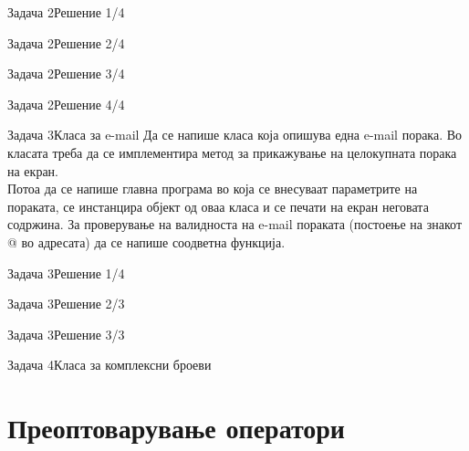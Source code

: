 \begin{frame}[fragile]{Задача 2}{Решение 1/4}

\end{frame}

\begin{frame}[fragile]{Задача 2}{Решение 2/4}

\end{frame}

\begin{frame}[fragile]{Задача 2}{Решение 3/4}

\end{frame}

\begin{frame}[fragile]{Задача 2}{Решение 4/4}

\end{frame}

\begin{frame}{Задача 3}{Класа за e-mail}
Да се напише класа која опишува една e-mail порака. Во класата треба да се
имплементира метод за прикажување на целокупната порака на екран.\\
Потоа да се напише главна програма во која се внесуваат параметрите на пораката,
се инстанцира објект од оваа класа и се печати на екран неговата содржина. За
проверување на валидноста на e-mail пораката (постоење на знакот @ во адресата)
да се напише соодветна функција.
\end{frame}

\begin{frame}[fragile]{Задача 3}{Решение 1/4}

\end{frame}

\begin{frame}[fragile]{Задача 3}{Решение 2/3}

\end{frame}

\begin{frame}[fragile]{Задача 3}{Решение 3/3}

\end{frame}

\begin{frame}[fragile]{Задача 4}{Класа за комплексни броеви}

\end{frame}

\section{Преоптоварување оператори}

